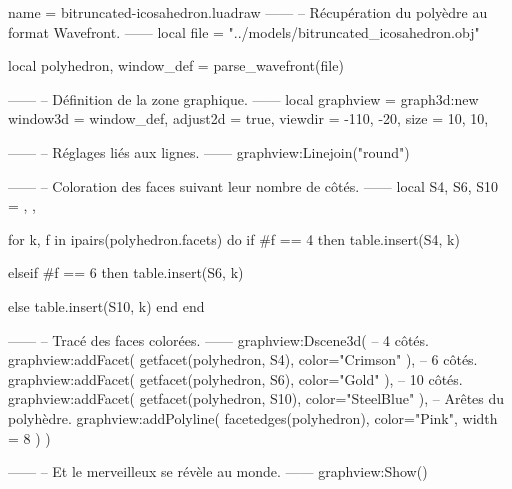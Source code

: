 \documentclass{standalone}
\begin{document}
\begin{luadraw}{name = bitruncated-icosahedron.luadraw}
------
-- Récupération du polyèdre au format Wavefront.
------
local file = "../models/bitruncated_icosahedron.obj"

local polyhedron, window_def = parse_wavefront(file)

------
-- Définition de la zone graphique.
------
local graphview = graph3d:new{
  window3d = window_def,
  adjust2d = true,
  viewdir  = {-110, -20},
  size     = {10, 10},
}

------
-- Réglages liés aux lignes.
------
graphview:Linejoin("round")

------
-- Coloration des faces suivant leur nombre de côtés.
------
local S4, S6, S10 = {}, {}, {}

for k, f in ipairs(polyhedron.facets) do
  if #f == 4 then
    table.insert(S4, k)

  elseif #f == 6 then
    table.insert(S6, k)

  else
    table.insert(S10, k)
  end
end

------
-- Tracé des faces colorées.
------
graphview:Dscene3d(
-- 4 côtés.
  graphview:addFacet(
    getfacet(polyhedron, S4),
    {
      color="Crimson"
    }),
-- 6 côtés.
  graphview:addFacet(
    getfacet(polyhedron, S6),
    {
      color="Gold"
    }),
-- 10 côtés.
  graphview:addFacet(
    getfacet(polyhedron, S10),
    {
      color="SteelBlue"
    }),
-- Arêtes du polyhèdre.
  graphview:addPolyline(
    facetedges(polyhedron),
    {
      color="Pink",
      width = 8
    })
)

------
-- Et le merveilleux se révèle au monde.
------
graphview:Show()
\end{luadraw}
\end{document}
